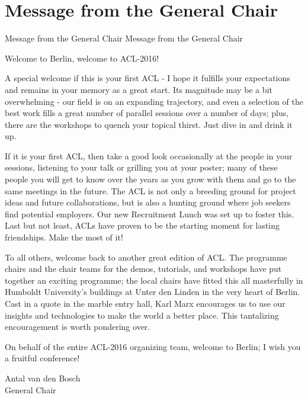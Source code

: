 \section{Message from the General Chair}\vspace{2em}
\setheaders%
    {Message from the General Chair}%
    {Message from the General Chair}
\thispagestyle{emptyheader}

\setlength{\parskip}{1ex}

Welcome to Berlin, welcome to ACL-2016!

A special welcome if this is your first ACL -  I hope it fulfills your expectations and remains in your memory as a great start. Its magnitude may be a bit overwhelming - our field is on an expanding trajectory, and even a selection of the best work fills a great number of parallel sessions over a number of days; plus, there are the workshops to quench your topical thirst. Just dive in and drink it up.

If it is your first ACL, then take a good look occasionally at the people in your sessions, listening to your talk or grilling you at your poster; many of these people you will get to know over the years as you grow with them and go to the same meetings in the future. The ACL is not only a breeding ground for project ideas and future collaborations, but is also a hunting ground where job seekers find potential employers. Our new Recruitment Lunch was set up to foster this. Last but not least, ACLs have proven to be the starting moment for lasting friendships. Make the most of it!

To all others, welcome back to another great edition of ACL. The programme chairs and the chair teams for the demos, tutorials, and workshops have put together an exciting programme; the local chairs have fitted this all masterfully in Humboldt University’s buildings at Unter den Linden in the very heart of Berlin. Cast in a quote in the marble entry hall, Karl Marx encourages us to use our insights and technologies to make the world a better place. This tantalizing encouragement is worth pondering over.

On behalf of the entire ACL-2016 organizing team, welcome to Berlin; I wish you a fruitful conference!

\vskip 0.5in
\noindent Antal van den Bosch\\
General Chair

